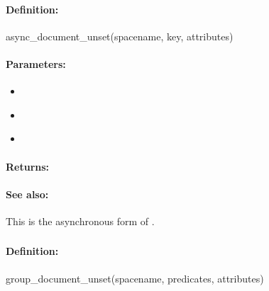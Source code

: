 \paragraph{Definition:}
\begin{rubycode}
async_document_unset(spacename, key, attributes)
\end{rubycode}

\paragraph{Parameters:}
\begin{itemize}[noitemsep]
\item {}\\

\item {}\\

\item {}\\

\end{itemize}

\paragraph{Returns:}


\paragraph{See also:}  This is the asynchronous form of .

\pagebreak
\subsubsection{}
\label{api:ruby:group_document_unset}


\paragraph{Definition:}
\begin{rubycode}
group_document_unset(spacename, predicates, attributes)
\end{rubycode}

